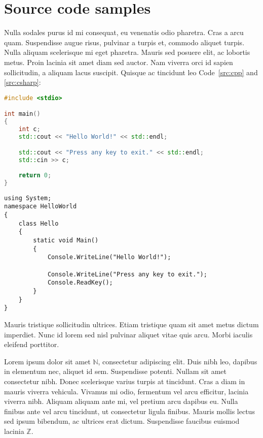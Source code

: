 
\section{Source code samples}

Nulla sodales purus id mi consequat, eu venenatis odio pharetra. Cras a arcu quam. Suspendisse augue risus, pulvinar a turpis et, commodo aliquet turpis. Nulla aliquam scelerisque mi eget pharetra. Mauris sed posuere elit, ac lobortis metus. Proin lacinia sit amet diam sed auctor. Nam viverra orci id sapien sollicitudin, a aliquam lacus suscipit. Quisque ac tincidunt leo Code~\ref{src:cpp} and \ref{src:csharp}:

\begin{lstlisting}[language={C++}]
#include <stdio>

int main() 
{
	int c;
	std::cout << "Hello World!" << std::endl;

	std::cout << "Press any key to exit." << std::endl;
	std::cin >> c;
	
	return 0;
}
\end{lstlisting}

\begin{lstlisting}[language={[Sharp]C}]
using System;
namespace HelloWorld
{
	class Hello 
	{
		static void Main() 
		{
			Console.WriteLine("Hello World!");
			
			Console.WriteLine("Press any key to exit.");
			Console.ReadKey();
		}
	}
}
\end{lstlisting}


\begin{definition}
Mauris tristique sollicitudin ultrices. Etiam tristique quam sit amet metus dictum imperdiet. Nunc id lorem sed nisl pulvinar aliquet vitae quis arcu. Morbi iaculis eleifend porttitor.
\end{definition}









Lorem ipsum dolor sit amet $\mathbb{N}$, consectetur adipiscing elit. Duis nibh leo, dapibus in elementum nec, aliquet id sem. Suspendisse potenti. Nullam sit amet consectetur nibh. Donec scelerisque varius turpis at tincidunt. Cras a diam in mauris viverra vehicula. Vivamus mi odio, fermentum vel arcu efficitur, lacinia viverra nibh. Aliquam aliquam ante mi, vel pretium arcu dapibus eu. Nulla finibus ante vel arcu tincidunt, ut consectetur ligula finibus. Mauris mollis lectus sed ipsum bibendum, ac ultrices erat dictum. Suspendisse faucibus euismod lacinia $\mathbb{Z}$.


